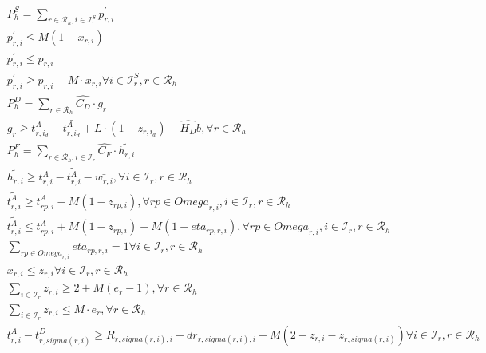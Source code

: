 \begin{align}
  & P_{h}^{S} = \sum_{r \in \mathcal{R}_{h}, i \in \mathcal{I}_{r}^{S}} p_{r , i}^{'} \tag{eq\_0001} \\
  & p_{r , i}^{'} \leq M \left(1 - x_{r , i}\right) \tag{eq\_0002\_a} \\
  & p_{r , i}^{'} \leq p_{r , i} \tag{eq\_0002\_b} \\
  & p_{r , i}^{'} \geq p_{r , i} - M \cdot x_{r , i} \forall i \in \mathcal{I}_{r}^{S} , r \in \mathcal{R}_{h} \tag{eq\_0002\_c} \\
  & P_{h}^{D} = \sum_{r \in \mathcal{R}_{h}} \hat{C_{D}} \cdot g_{r} \tag{eq\_0003} \\
  & g_{r} \geq t_{r , i_{d}}^{A} - \bar{t_{r , i_{d}}^{A}} + L \cdot \left(1 - z_{r , i_{d}}\right) - \hat{H_{D}} b , \forall r \in \mathcal{R}_{h} \tag{eq\_0004\_b} \\
  & P_{h}^{F} = \sum_{r \in \mathcal{R}_{h}, i \in \mathcal{I}_{r}} \hat{C_{F}} \cdot \tilde{h_{r , i}} \tag{eq\_0005} \\
  & \tilde{h_{r , i}} \geq t_{r , i}^{A} - \tilde{t_{r , i}^{A}} - \bar{w_{r , i}} , \forall i \in \mathcal{I}_{r} , r \in \mathcal{R}_{h} \tag{eq\_0006\_a} \\
  & \tilde{t_{r , i}^{A}} \geq t_{rp , i}^{A} - M \left(1 - z_{rp , i}\right) , \forall rp \in \mathit{Omega}_{r , i} , i \in \mathcal{I}_{r} , r \in \mathcal{R}_{h} \tag{eq\_0007\_a} \\
  & \tilde{t_{r , i}^{A}} \leq t_{rp , i}^{A} + M \left(1 - z_{rp , i}\right) + M \left(1 - \mathit{eta}_{rp , r , i}\right) , \forall rp \in \mathit{Omega}_{r , i} , i \in \mathcal{I}_{r} , r \in \mathcal{R}_{h} \tag{eq\_0007\_b} \\
  & \sum_{rp \in \mathit{Omega}_{r , i}} \mathit{eta}_{rp , r , i} = 1 \forall i \in \mathcal{I}_{r} , r \in \mathcal{R}_{h} \tag{eq\_0008} \\
  & x_{r , i} \leq z_{r , i} \forall i \in \mathcal{I}_{r} , r \in \mathcal{R}_{h} \tag{eq\_0009} \\
  & \sum_{i \in \mathcal{I}_{r}} z_{r , i} \geq 2 + M \left(e_{r} - 1\right) , \forall r \in \mathcal{R}_{h} \tag{eq\_0010\_a} \\
  & \sum_{i \in \mathcal{I}_{r}} z_{r , i} \leq M \cdot e_{r} , \forall r \in \mathcal{R}_{h} \tag{eq\_0010\_b} \\
  & t_{r , i}^{A} - t_{r , \mathit{sigma} \left(r , i\right)}^{D} \geq R_{r , \mathit{sigma} \left(r , i\right) , i} + d r_{r , \mathit{sigma} \left(r , i\right) , i} - M \left(2 - z_{r , i} - z_{r , \mathit{sigma} \left(r , i\right)}\right) \forall i \in \mathcal{I}_{r} , r \in \mathcal{R}_{h} \tag{eq\_0011} \\

\end{align}
